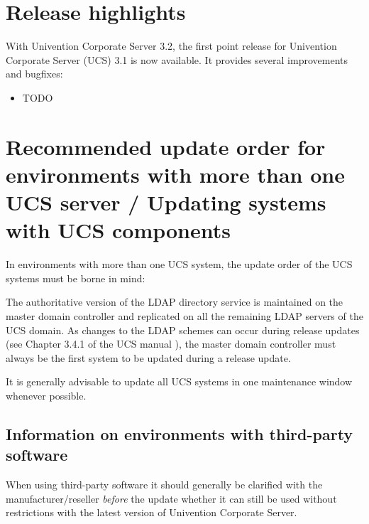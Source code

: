 


\newcommand{\ucsManualTitle}{UCS 3.2 Release Notes}
\newcommand{\ucsManualSubtitle}{Release notes for the installation and update of Univention Corporate Server (UCS) 3.2}
\newcommand{\ucsManualVersion}{3.2}
\newcommand{\ucsTechAuthor}{ & Univention GmbH & feedback@univention.de}

\setcounter{secnumdepth}{3}
\setcounter{tocdepth}{3}



\chapter{Release highlights}

With Univention Corporate Server 3.2, the first point release for
Univention Corporate Server (UCS) 3.1 is now available. It provides
several improvements and bugfixes:

\begin{itemize}
\item TODO %
\end{itemize}

\chapter{Recommended update order for environments with more than one UCS server / Updating systems with UCS components}

In environments with more than one UCS system, the update order of the
UCS systems must be borne in mind:

The authoritative version of the LDAP directory service
is maintained on the master domain controller and replicated on all the remaining
LDAP servers of the UCS domain. As changes to the LDAP schemes can
occur during release updates (see Chapter 3.4.1 of the UCS
manual \cite{UCS-Handbuch}), the master domain controller must always be the first
system to be updated during a release update.

It is generally advisable to update all UCS systems in one maintenance
window whenever possible. 

\section{Information on environments with third-party software}

When using third-party software it should generally be clarified with
the manufacturer/reseller \emph{before} the update whether it can still
be used without restrictions with the latest version of Univention
Corporate Server. 

